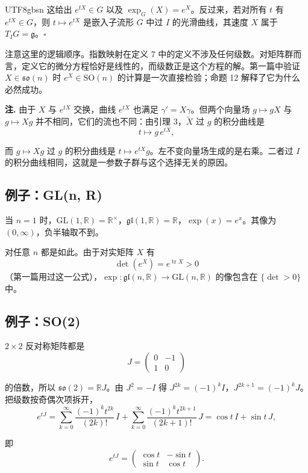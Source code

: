 \documentclass[11pt]{article}
\begin{document}
\begin{CJK*}{UTF8}{gbsn}
这给出 $e^{tX} \in G$ 以及 $\exp_G(X) = e^X$。反过来，若对所有 $t$ 有 $e^{tX} \in G$，则 $t \mapsto e^{tX}$ 是嵌入子流形 $G$ 中过 $I$ 的光滑曲线，其速度 $X$ 属于 $T_IG = \mathfrak{g}$。$\square$

注意这里的逻辑顺序。指数映射在定义 7 中的定义不涉及任何级数。对矩阵群而言，定义它的微分方程恰好是线性的，而级数正是这个方程的解。第一篇中验证 $X \in \mathfrak{so}(n)$ 时 $e^X \in \mathrm{SO}(n)$ 的计算是一次直接检验；命题 12 解释了它为什么必然成功。

\textbf{注.} 由于 $X$ 与 $e^{tX}$ 交换，曲线 $e^{tX}$ 也满足 $\gamma' = X\gamma$。但两个向量场 $g \mapsto gX$ 与 $g \mapsto Xg$ 并不相同，它们的流也不同：由引理 3，$\widetilde{X}$ 过 $g$ 的积分曲线是
\[
t \longmapsto g\, e^{tX},
\]

而 $g \mapsto Xg$ 过 $g$ 的积分曲线是 $t \mapsto e^{tX} g$。左不变向量场生成的是右乘。二者过 $I$ 的积分曲线相同，这就是一参数子群与这个选择无关的原因。

\subsection{例子：GL(n, R)}

当 $n = 1$ 时，$\mathrm{GL}(1, \mathbb{R}) = \mathbb{R}^\times$，$\mathfrak{gl}(1, \mathbb{R}) = \mathbb{R}$，$\exp(x) = e^x$。其像为 $(0, \infty)$，负半轴取不到。

对任意 $n$ 都是如此。由于对实矩阵 $X$ 有
\[
\det(e^X) = e^{\operatorname{tr} X} > 0
\]
（第一篇用过这一公式），$\exp : \mathfrak{gl}(n, \mathbb{R}) \to \mathrm{GL}(n, \mathbb{R})$ 的像包含在 $\{ \det > 0 \}$ 中。

\subsection{例子：SO(2)}

$2 \times 2$ 反对称矩阵都是
\[
J = \begin{pmatrix} 0 & -1 \\ 1 & 0 \end{pmatrix}
\]

的倍数，所以 $\mathfrak{so}(2) = \mathbb{R}J$。由 $J^2 = -I$ 得 $J^{2k} = (-1)^k I$，$J^{2k+1} = (-1)^k J$。把级数按奇偶次项拆开，
\[
e^{tJ} = \sum_{k=0}^{\infty} \frac{(-1)^k t^{2k}}{(2k)!}\, I + \sum_{k=0}^{\infty} \frac{(-1)^k t^{2k+1}}{(2k+1)!}\, J = \cos t\, I + \sin t\, J,
\]

即
\[
\boxed{
e^{tJ} = \begin{pmatrix} \cos t & -\sin t \\ \sin t & \cos t \end{pmatrix}.
}
\]


\end{CJK*}
\end{document}
